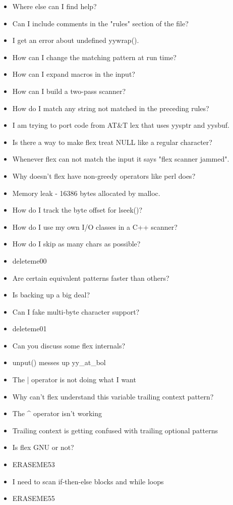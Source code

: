 \documentclass[openany,oneside]{book}
\begin{document}
\begin{itemize}
\item Where else can I find help?
\item Can I include comments in the "rules" section of the file?
\item I get an error about undefined yywrap().
\item How can I change the matching pattern at run time?
\item How can I expand macros in the input?
\item How can I build a two-pass scanner?
\item How do I match any string not matched in the preceding rules?
\item I am trying to port code from AT\&{}T lex that uses yysptr and yysbuf.
\item Is there a way to make flex treat NULL like a regular character?
\item Whenever flex can not match the input it says "flex scanner jammed".
\item Why doesn't flex have non-greedy operators like perl does?
\item Memory leak - 16386 bytes allocated by malloc.
\item How do I track the byte offset for lseek()?
\item How do I use my own I/O classes in a C++ scanner?
\item How do I skip as many chars as possible?
\item deleteme00
\item Are certain equivalent patterns faster than others?
\item Is backing up a big deal?
\item Can I fake multi-byte character support?
\item deleteme01
\item Can you discuss some flex internals?
\item unput() messes up yy\_{}at\_{}bol
\item The | operator is not doing what I want
\item Why can't flex understand this variable trailing context pattern?
\item The \^{} operator isn't working
\item Trailing context is getting confused with trailing optional patterns
\item Is flex GNU or not?
\item ERASEME53
\item I need to scan if-then-else blocks and while loops
\item ERASEME55

\end{itemize}
\end{document}
